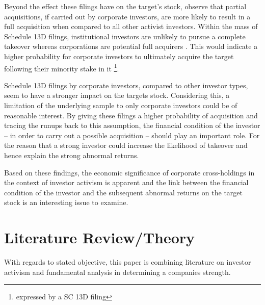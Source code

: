 \documentclass[12pt]{article}
\begin{document}
Beyond the effect these filings have on the target's stock, \citet{Akhigbe2007} observe that partial acquisitions, if carried out by corporate investors, are more likely to result in a full acquisition when compared to all other activist investors. Within the mass of Schedule 13D filings, institutional investors are unlikely to pursue a complete takeover whereas corporations are potential full acquirers \citep{Brigida2012}. This would indicate a higher probability for corporate investors to ultimately acquire the target following their minority stake in it \citep{Greenwood2009} \footnote{expressed by a SC 13D filing}. 

Schedule 13D filings by corporate investors, compared to other investor types, seem to have a stronger impact on the targets stock. Considering this, a limitation of the underlying sample to only corporate investors could be of reasonable interest. 
By giving these filings a higher probability of acquisition and tracing the runups back to this assumption, the financial condition of the investor -- in order to carry out a possible acquisition -- should play an important role. For the reason that a strong investor could increase the likelihood of takeover and hence explain the strong abnormal returns.
 
Based on these findings, the economic significance of corporate cross-holdings in the context of investor activism is apparent and the link between the financial condition of the investor and the subsequent abnormal returns on the target stock is an interesting issue to examine. 

\section{Literature Review/Theory}

With regards to stated objective, this paper is combining literature on investor activism and fundamental analysis in determining a companies strength.
\end{document}
